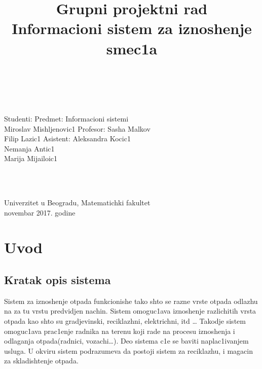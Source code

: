 \documentclass[10 pt]{article}
\title{\vspace*{\fill}\huge{\textbf{Grupni projektni rad\\ 
		\vspace{10 pt} Informacioni sistem za iznoshenje smec1a}}}
\date{}
\author{}
\begin{document}
\maketitle	

\
\\[270 pt]
\
\begin{flushleft}
	Studenti:\hspace{260 pt} Predmet: Informacioni sistemi\\ 
	Miroslav Mishljenovic1\hspace{197 pt} Profesor: Sasha Malkov\\
	Filip Lazic1\hspace{244 pt} Asistent: Aleksandra Kocic1\\
	Nemanja Antic1\\
	Marija Mijailoic1 
 \end{flushleft}

 \
 \\[50 pt]
 \
\begin{center}
  Univerzitet u Beogradu, Matematichki fakultet
  \\ novembar 2017. godine
\end{center}

\thispagestyle{empty}

\newpage
\tableofcontents

\newpage
\section{Uvod}

\subsection{Kratak opis sistema}
\setlength{\parindent}{30pt} Sistem za iznoshenje otpada funkcionishe tako shto se razne vrste otpada odlazhu na za tu vrstu predvidjen nachin. Sistem omoguc1ava iznoshenje razlichitih vrsta otpada kao shto su gradjevinski, reciklazhni, elektrichni, itd … Takodje sistem omoguc1ava prac1enje radnika na terenu koji rade na procesu iznoshenja i odlaganja otpada(radnici, vozachi…). Deo sistema c1e se baviti naplac1ivanjem usluga. U okviru sistem podrazumeva da postoji sistem za reciklazhu, i magacin za skladishtenje otpada.  
\end{document}
